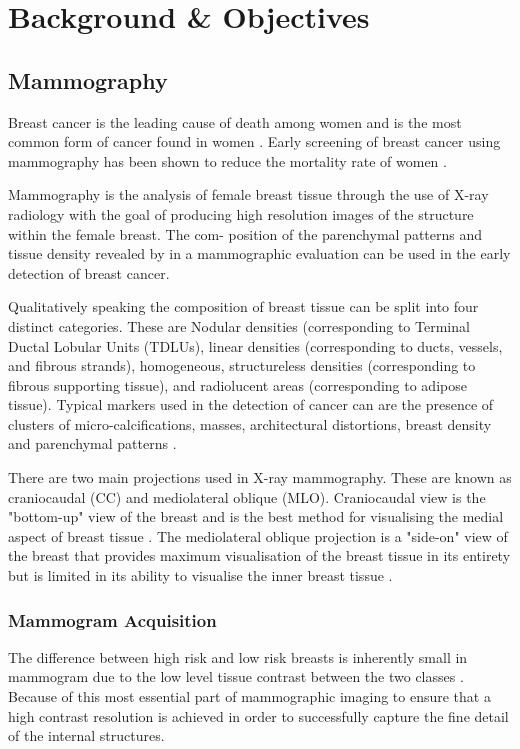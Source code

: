 \chapter{Background \& Objectives}

\section{Mammography}

Breast cancer is the leading cause of death among women and is the most common form of cancer found in women \cite{siegel2014cancer}. Early screening of breast cancer using mammography has been shown to reduce the mortality rate of women \cite{independent2012benefits, smith2014cancer}.

Mammography is the analysis of female breast tissue through the use of X-ray radiology with the goal of producing high resolution images of the structure within the female breast. The com- position of the parenchymal patterns and tissue density revealed by in a mammographic evaluation can be used in the early detection of breast cancer.

Qualitatively speaking the composition of breast tissue can be split into four distinct categories. These are Nodular densities (corresponding to Terminal Ductal Lobular Units (TDLUs), linear densities (corresponding to ducts, vessels, and fibrous strands), homogeneous, structureless densities (corresponding to fibrous supporting tissue), and radiolucent areas (corresponding to adipose tissue)\cite{tabar2005breast}. Typical markers used in the detection of cancer can are the presence of clusters of micro-calcifications, masses, architectural distortions, breast density and parenchymal patterns \cite{sampat2005computer}.

There are two main projections used in X-ray mammography. These are known as craniocaudal (CC) and mediolateral oblique (MLO). Craniocaudal view is the "bottom-up" view of the breast and is the best method for visualising the medial aspect of breast tissue \cite{fischer2008breast}. The mediolateral oblique projection is a "side-on" view of the breast that provides maximum visualisation of the breast tissue in its entirety but is limited in its ability to visualise the inner breast tissue \cite{fischer2008breast}.

\subsection{Mammogram Acquisition}
The difference between high risk and low risk breasts is inherently small in mammogram due to the low level tissue contrast between the two classes \cite{kopans1998breast}. Because of this most essential part of mammographic imaging to ensure that a high contrast resolution is achieved in order to successfully capture the fine detail of the internal structures.

